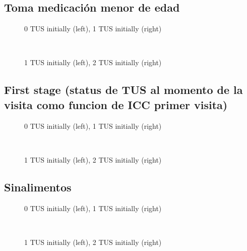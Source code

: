 \documentclass[12pt]{article}
\begin{document}
\subsection{Toma medicación menor de edad}
\begin{figure}[H]%
	\centering
	\caption*{0 TUS initially (left), 1 TUS initially (right)}
	 \quad 
	 \\
	
	\caption*{1 TUS initially (left), 2 TUS initially (right)}
	 \qquad
	\label{fig:tomamedicacion18Two}%
\end{figure}


\subsection{First stage (status de TUS al momento de la visita como funcion de ICC primer visita)}
\begin{figure}[H]%
	\centering
	\caption*{0 TUS initially (left), 1 TUS initially (right)}
	 \quad 
	 \\
	
	\caption*{1 TUS initially (left), 2 TUS initially (right)}
	 \qquad
	\label{fig:hogarzerocobratusTwo}%
\end{figure}

\subsection{Sinalimentos}
\begin{figure}[H]%
	\centering
	\caption*{0 TUS initially (left), 1 TUS initially (right)}
	 \quad 
	 \\
	
	\caption*{1 TUS initially (left), 2 TUS initially (right)}
	 \qquad
	\label{fig:sinalimentosTwo}%
\end{figure}
\end{document}

